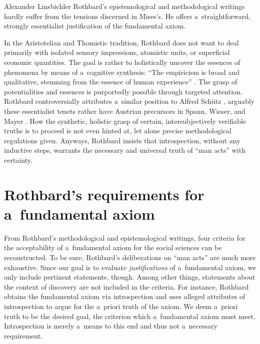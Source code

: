 \begin{artengenv}{Alexander Linsbichler}
Rothbard's epistemological and methodological writings hardly suffer from the tensions discerned in Mises's. He offers a~straightforward, strongly essentialist justification of the fundamental axiom.



In the Aristotelian and Thomistic tradition, Rothbard does not want to deal primarily with isolated sensory impressions, atomistic units, or superficial economic quantities. The goal is rather to holistically uncover the essences of phenomena by means of a~cognitive synthesis: ``The empiricism is broad and qualitative, stemming from the essence of human experience'' 
\parencite[][p.xvi]{mises_preface_2007}. %
 The grasp of potentialities and essences is purportedly possible through targeted attention. Rothbard controversially attributes a~similar position to Alfred Schütz 
\parencites[][]{rothbard_praxeology_2011}[][]{rothbard_praxeology:_1976}, %
 arguably these essentialist tenets rather have Austrian precursors in Spann, Wieser, and Mayer 
\parencites[][]{milford_abkopplung_1997}[][]{linsbichler_viel_2022}. %
 How the synthetic, holistic grasp of certain, intersubjectively verifiable truths is to proceed is not even hinted at, let alone precise methodological regulations given. Anyways, Rothbard insists that introspection, without any inductive steps, warrants the necessary and universal truth of ``man acts'' with certainty.



\section{Rothbard's requirements for a~fundamental axiom}

From Rothbard's methodological and epistemological writings, four criteria for the acceptability of a~fundamental axiom for the social sciences can be reconstructed. To be sure, Rothbard's deliberations on ``man acts'' are much more exhaustive. Since our goal is to evaluate \textit{justifications} of a~fundamental axiom, we only include pertinent statements, though. Among other things, statements about the context of discovery are not included in the criteria. For instance, Rothbard obtains the fundamental axiom via introspection and uses alleged attributes of introspection to argue for the a~priori truth of the axiom. We deem a~priori truth to be the desired goal, the criterion which a~fundamental axiom must meet. Introspection is merely a~means to this end and thus not a~necessary requirement.




\end{artengenv}
